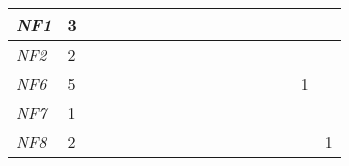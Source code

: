 \begin{table}[]
{\begin{tabular}{|l|l|l|l|l|l|l|l|l|l|l|l|l|l|l|l|l|}
\textit{NF1}  & 3                                                     &                                                       &    &                                                       &    &                                                       &                                                       &    &    &                                                       &    &                                                  &                                                  &    &    &    \\ \hline
\textit{NF2}  & 2                                                     &                                                       &    &                                                       &    &                                                       &                                                       &    &    &                                                       &    &                                                  &                                                  &    &    &    \\ \hline
\textit{NF6}  & 5                                                     &                                                       &    &                                                       &    &                                                       &                                                       &    &    &                                                       &    &                                                  &                                                  &    & 1  &    \\ \hline
\textit{NF7}  & 1                                                     &                                                       &    &                                                       &    &                                                       &                                                       &    &    &                                                       &    &                                                  &                                                  &    &    &    \\ \hline
\textit{NF8}  & 2                                                     &                                                       &    &                                                       &    &                                                       &                                                       &    &    &                                                       &    &                                                  &                                                  &    &    & 1  \\ \hline

\end{tabular}}
\end{table}
